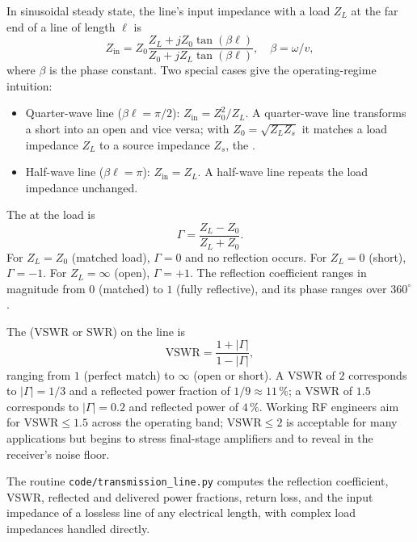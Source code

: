 In sinusoidal steady state, the line's input impedance with a load
$Z_{L}$ at the far end of a line of length $\ell$ is
\[
Z_{\text{in}} = Z_{0}\frac{Z_{L} + jZ_{0}\tan(\beta \ell)}{Z_{0} +
jZ_{L}\tan(\beta \ell)}, \quad \beta = \omega/v,
\]
where $\beta$ is the phase constant. Two special cases give the
operating-regime intuition:
\begin{itemize}[leftmargin=*]
  \item Quarter-wave line ($\beta \ell = \pi/2$): $Z_{\text{in}} =
    Z_{0}^{2}/Z_{L}$. A quarter-wave line transforms a short into an
    open and vice versa; with $Z_{0} = \sqrt{Z_{L}Z_{s}}$ it matches
    a load impedance $Z_{L}$ to a source impedance $Z_{s}$, the
    .
  \item Half-wave line ($\beta \ell = \pi$): $Z_{\text{in}} = Z_{L}$.
    A half-wave line repeats the load impedance unchanged.
\end{itemize}

The  at the load is
\[
\Gamma = \frac{Z_{L}-Z_{0}}{Z_{L}+Z_{0}}.
\]
For $Z_{L} = Z_{0}$ (matched load), $\Gamma = 0$ and no reflection
occurs. For $Z_{L} = 0$ (short), $\Gamma = -1$. For $Z_{L} = \infty$
(open), $\Gamma = +1$. The reflection coefficient ranges in magnitude
from $0$ (matched) to $1$ (fully reflective), and its phase ranges
over $360^{\circ}$.

The  (VSWR or SWR) on the line is
\[
\text{VSWR} = \frac{1+|\Gamma|}{1-|\Gamma|},
\]
ranging from $1$ (perfect match) to $\infty$ (open or short). A VSWR
of $2$ corresponds to $|\Gamma| = 1/3$ and a reflected power fraction
of $1/9 \approx 11\,\%$; a VSWR of $1.5$ corresponds to $|\Gamma| =
0.2$ and reflected power of $4\,\%$. Working RF engineers aim for
$\text{VSWR}\le 1.5$ across the operating band; $\text{VSWR} \le 2$ is
acceptable for many applications but begins to stress final-stage
amplifiers and to reveal in the receiver's noise floor.





The routine \texttt{code/transmission\_line.py} computes the reflection
coefficient, VSWR, reflected and delivered power fractions, return loss,
and the input impedance of a lossless line of any electrical length,
with complex load impedances handled directly.

